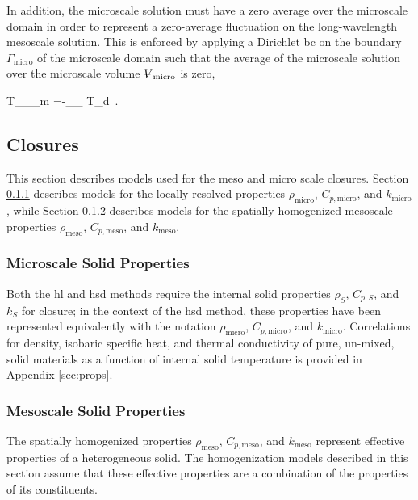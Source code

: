 In addition, the microscale solution must have a zero average over the microscale domain in order to represent a zero-average fluctuation on the long-wavelength mesoscale solution. This is enforced by applying a Dirichlet \gls{bc} on the boundary \(\Gamma_\text{micro}\) of the microscale domain such that the average of the microscale solution over the microscale volume \(\volume_\text{micro}\) is zero,

\beq
\label{eq:ConstantShiftMMD}
T_\rvert_{\Gamma_m} =-\int_{\volume_} T_d\volume\ .
\eeq

\subsection{Closures}
\label{sec:ClosuresMesoMicro}

This section describes models used for the meso and micro scale closures. Section \ref{sec:micro_props} describes models for the locally resolved properties \(\rho_\text{micro}\), \(C_{p,\text{micro}}\), and \(k_\text{micro}\), while Section \ref{sec:meso_props} describes models for the spatially homogenized mesoscale properties \(\rho_\text{meso}\), \(C_{p,\text{meso}}\), and \(k_\text{meso}\).


\subsubsection{Microscale Solid Properties}
\label{sec:micro_props}

Both the \gls{hl} and \gls{hsd} methods require the internal solid properties \(\rho_S\), \(C_{p,S}\), and \(k_S\) for closure; in the context of the \gls{hsd} method, these properties have been represented equivalently with the notation \(\rho_\text{micro}\), \(C_{p,\text{micro}}\), and \(k_\text{micro}\). Correlations for density, isobaric specific heat, and thermal conductivity of pure, un-mixed, solid materials as a function of internal solid temperature is provided in Appendix \ref{sec:props}.

\subsubsection{Mesoscale Solid Properties}
\label{sec:meso_props}

The spatially homogenized properties \(\rho_\text{meso}\), \(C_{p,\text{meso}}\), and \(k_\text{meso}\) represent effective properties of a heterogeneous solid. The homogenization models described in this section assume that these effective properties are a combination of the properties of its constituents.

